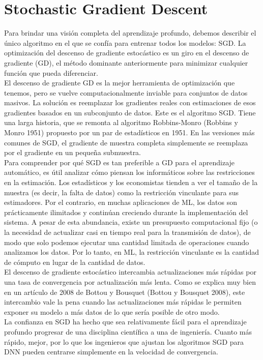 \section{Stochastic Gradient Descent}
Para brindar una visión completa del aprendizaje profundo, debemos describir el único algoritmo en el que se confía para entrenar todos los modelos: SGD. La optimización del descenso de gradiente estocástico es un giro en el descenso de gradiente (GD), el método dominante anteriormente para minimizar cualquier función que pueda diferenciar.\\
El descenso de gradiente GD es la mejor herramienta de optimización que tenemos, pero se vuelve computacionalmente inviable para conjuntos de datos masivos. La solución es reemplazar los gradientes reales con estimaciones de esos gradientes basados en un subconjunto de datos. Este es el algoritmo SGD. Tiene una larga historia, que se remonta al algoritmo Robbins-Monro (Robbins y Monro 1951) propuesto por un par de estadísticos en 1951. En las versiones más comunes de SGD, el gradiente de muestra completa simplemente se reemplaza por el gradiente en un pequeña submuestra.\\
Para comprender por qué SGD es tan preferible a GD para el aprendizaje automático, es útil analizar cómo piensan los informáticos sobre las restricciones en la estimación. Los estadísticos y los economistas tienden a ver el tamaño de la muestra (es decir, la falta de datos) como la restricción vinculante para sus estimadores. Por el contrario, en muchas aplicaciones de ML, los datos son prácticamente ilimitados y continúan creciendo durante la implementación del sistema. A pesar de esta abundancia, existe un presupuesto computacional fijo (o la necesidad de actualizar casi en tiempo real para la transmisión de datos), de modo que solo podemos ejecutar una cantidad limitada de operaciones cuando analizamos los datos. Por lo tanto, en ML, la restricción vinculante es la cantidad de cómputo en lugar de la cantidad de datos.\\
El descenso de gradiente estocástico intercambia actualizaciones más rápidas por una tasa de convergencia por actualización más lenta. Como se explica muy bien en un artículo de 2008 de Bottou y Bousquet (Bottou y Bousquet 2008), este intercambio vale la pena cuando las actualizaciones más rápidas le permiten exponer su modelo a más datos de lo que sería posible de otro modo.\\
La confianza en SGD ha hecho que sea relativamente fácil para el aprendizaje profundo progresar de una disciplina científica a una de ingeniería. Cuanto más rápido, mejor, por lo que los ingenieros que ajustan los algoritmos SGD para DNN pueden centrarse simplemente en la velocidad de convergencia.\\

